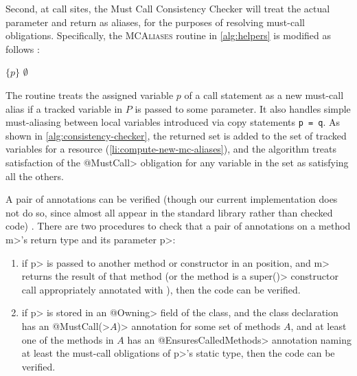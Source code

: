 Second, at call sites, the Must Call Consistency Checker will treat the actual
parameter and return as aliases, for the purposes of resolving must-call
obligations.  Specifically, the \textsc{MCAliases} routine in \cref{alg:helpers}
is modified as follows :
\begin{algorithmic}
    \State \Return $\{p\}$
    \EndIf
    \State \Return $\emptyset$
    \EndProcedure
\end{algorithmic}
The routine treats the assigned variable $p$ of a call statement as a new
must-call alias if a tracked variable in $P$ is passed to some \mccannot
parameter.  It also handles simple must-aliasing between local variables
introduced via copy statements \lstinline{p = q}.  As shown in
\cref{alg:consistency-checker}, the returned set is added to the set of tracked
variables for a resource (\cref{li:compute-new-mc-aliases}), and the algorithm
treats satisfaction of the \<@MustCall> obligation for any variable in the set
as satisfying all the others.



A pair of \mccannot annotations can be verified (though our current
implementation does not do so, since almost all appear in the standard
library rather than checked code) . There are two
procedures to check
that a pair of \mccannot annotations on a method \<m>'s return type
and its parameter \<p>:
\begin{enumerate}
\item if \<p> is passed to another method or constructor in an
  \mccannot position, and \<m> returns the result of that method
  (or the method is a \<super()> constructor call appropriately annotated
  with \mccannot), then the code can be verified.
\item if \<p> is stored in an \<@Owning> field of the class, and the
  class declaration has an \<@MustCall(>$A$\<)> annotation for some set
  of methods $A$, and at least one of the methods in $A$ has an
  \<@EnsuresCalledMethods> annotation naming at least the
  must-call obligations of \<p>'s static type, then the code can be verified.
\end{enumerate}

